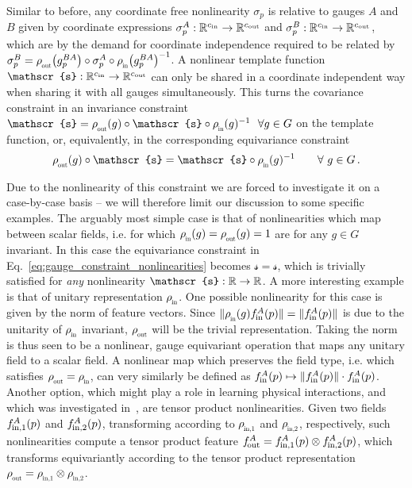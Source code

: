 Similar to before, any coordinate free nonlinearity $\sigma_p$ is relative to gauges $A$ and $B$ given by coordinate expressions $\sigma_p^A: \mathbb{R}^{{c_\textup{in}}} \to \mathbb{R}^{{c_\textup{out}}}$ and $\sigma_p^B: \mathbb{R}^{{c_\textup{in}}} \to \mathbb{R}^{{c_\textup{out}}}$, which are by the demand for coordinate independence required to be related by $\sigma_p^B = \rhoout\big( g_p^{BA}\big) \circ \sigma_p^A \circ \rhoin\big( g_p^{BA}\big)^{-1}$.
A nonlinear template function $\mathscr{s}: \R^{\cin} \to \R^{\cout}$ can only be shared in a coordinate independent way when sharing it with all gauges simultaneously.
This turns the covariance constraint in an invariance constraint $\mathscr{s} = \rhoout(g) \circ \mathscr{s} \circ \rhoin(g)^{-1}\ \ \forall g\in G$ on the template function, or, equivalently, in the corresponding equivariance constraint
\begin{align}\label{eq:gauge_constraint_nonlinearities}
    \rhoout(g) \circ \mathscr{s} = \mathscr{s} \circ \rhoin(g)^{-1} \qquad \forall\ g\in G \,.
\end{align}


Due to the nonlinearity of this constraint we are forced to investigate it on a case-by-case basis -- we will therefore limit our discussion to some specific examples.
The arguably most simple case is that of nonlinearities which map between scalar fields, i.e. for which $\rhoin(g) = \rhoout(g) = 1$ are for any $g \in G$ invariant.
In this case the equivariance constraint in Eq.~\eqref{eq:gauge_constraint_nonlinearities} becomes $\mathscr{s} = \mathscr{s}$, which is trivially satisfied for \emph{any} nonlinearity $\mathscr{s}: \R \to \R$.
A more interesting example is that of unitary representation $\rhoin$.
One possible nonlinearity for this case is given by the norm of feature vectors.
Since $\lVert \rhoin(g) \fin^A(p) \rVert = \lVert \fin^A(p) \rVert$ is due to the unitarity of $\rhoin$ invariant, $\rhoout$ will be the trivial representation.
Taking the norm is thus seen to be a nonlinear, gauge equivariant operation that maps any unitary field to a scalar field.
A nonlinear map which preserves the field type, i.e. which satisfies $\rhoout = \rhoin$, can very similarly be defined as $f_\textup{\;\!\!in}^A(p) \mapsto \lVert f_\textup{\;\!\!in}^A(p)\rVert \cdot f_\textup{\;\!\!in}^A(p)$.
Another option, which might play a role in learning physical interactions, and which was investigated in~\cite{kondor2018ClebschGordan,Kondor2018-NBN,anderson2019cormorant,alex2020lorentz}, are tensor product nonlinearities.
Given two fields $f_\textup{\;\!\!in,1}^A(p)$ and $f_\textup{\;\!\!in,2}^A(p)$, transforming according to
$\rho_{\overset{}{\protect\scalebox{.6}{\;\!\!\textup{in},1}}}$ and $\rho_{\overset{}{\protect\scalebox{.6}{\;\!\!\textup{in},2}}}$,
respectively, such nonlinearities compute a tensor product feature $f_\textup{\:\!\!out}^A = f_\textup{\;\!\!in,1}^A(p) \otimes f_\textup{\;\!\!in,2}^A(p)$, which transforms equivariantly according to the tensor product representation
$\rhoout = \rho_{\overset{}{\protect\scalebox{.6}{\;\!\!\textup{in},1}}} \otimes \rho_{\overset{}{\protect\scalebox{.6}{\;\!\!\textup{in},2}}}$.


